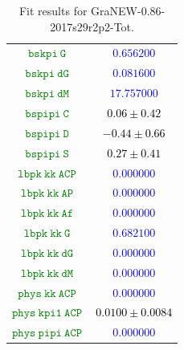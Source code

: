 \documentclass[10pt,a4paper]{article}
\begin{document}
\begin{table}[h!]
\begin{tabular}{cc}
\textcolor{Green}{$\mathtt{bskpi~G~}$} & \textcolor{blue}{$0.656200$}\\
\textcolor{Green}{$\mathtt{bskpi~dG~}$} & \textcolor{blue}{$0.081600$}\\
\textcolor{Green}{$\mathtt{bskpi~dM~}$} & \textcolor{blue}{$17.757000$}\\
\textcolor{Green}{$\mathtt{bspipi~C~}$} & \textcolor{black}{$0.06 \pm 0.42$}\\
\textcolor{Green}{$\mathtt{bspipi~D~}$} & \textcolor{black}{$-0.44 \pm 0.66$}\\
\textcolor{Green}{$\mathtt{bspipi~S~}$} & \textcolor{black}{$0.27 \pm 0.41$}\\
\textcolor{Green}{$\mathtt{lbpk~kk~ACP~}$} & \textcolor{blue}{$0.000000$}\\
\textcolor{Green}{$\mathtt{lbpk~kk~AP~}$} & \textcolor{blue}{$0.000000$}\\
\textcolor{Green}{$\mathtt{lbpk~kk~Af~}$} & \textcolor{blue}{$0.000000$}\\
\textcolor{Green}{$\mathtt{lbpk~kk~G~}$} & \textcolor{blue}{$0.682100$}\\
\textcolor{Green}{$\mathtt{lbpk~kk~dG~}$} & \textcolor{blue}{$0.000000$}\\
\textcolor{Green}{$\mathtt{lbpk~kk~dM~}$} & \textcolor{blue}{$0.000000$}\\
\textcolor{Green}{$\mathtt{phys~kk~ACP~}$} & \textcolor{blue}{$0.000000$}\\
\textcolor{Green}{$\mathtt{phys~kpi1~ACP~}$} & \textcolor{black}{$0.0100 \pm 0.0084$}\\
\textcolor{Green}{$\mathtt{phys~pipi~ACP~}$} & \textcolor{blue}{$0.000000$}\\
\hline
\end{tabular}
\caption{Fit results for GraNEW-0.86-2017s29r2p2-Tot.}
\label{tab:GraNEW_0.86_2017s29r2p2_Tot}
\end{table}
\end{document}
